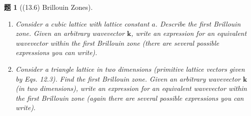 \documentclass[UTF8,10pt,a4paper]{article}
\theoremstyle{Problem}
\newtheorem{prob}{题}
\theoremstyle{Solution}
\begin{document}
\begin{prob}[(13.6) Brillouin Zones]
    \begin{enumerate}
        \item[(a)] Consider a cubic lattice with lattice constant $a$. Describe the first Brillouin zone. Given an arbitrary wavevector $\bm{k}$, write an expression for an equivalent wavevector within the first Brillouin zone (there are several possible expressions you can write).
        \item[(b)] Consider a triangle lattice in two dimensions (primitive lattice vectors given by Eqs. 12.3). Find the first Brillouin zone. Given an arbitrary wavevector $\bm{k}$ (in two dimensions), write an expression for an equivalent wavevector within the first Brillouin zone (again there are several possible expressions you can write).
    \end{enumerate}
\end{prob}
\end{document}
